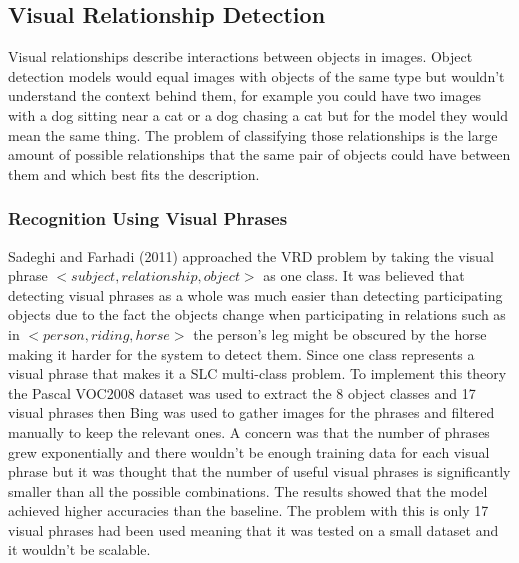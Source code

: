 \documentclass{csfyp}
\begin{document}
\subsection{Visual Relationship Detection}
Visual relationships describe interactions between objects in images. Object detection models would equal images with objects of the same type but wouldn't understand the context behind them, for example you could have two images with a dog sitting near a cat or a dog chasing a cat but for the model they would mean the same thing. The problem of classifying those relationships is the large amount of possible relationships that the same pair of objects could have between them and which best fits the description. 


\subsubsection{Recognition Using Visual Phrases}
Sadeghi and Farhadi (2011) approached the VRD problem by taking the visual phrase $<subject, relationship , object>$ as one class. It was believed that detecting visual phrases as a whole was much easier than detecting participating objects due to the fact the objects change when participating in relations such as in $<person,riding,horse>$ the person’s leg might be obscured by the horse making it harder for the system to detect them. Since one class represents a visual phrase that makes it a SLC multi-class problem. To implement this theory the Pascal VOC2008 dataset was used to extract the 8 object classes and 17 visual phrases then Bing was used to gather images for the phrases and filtered manually to keep the relevant ones.  A concern was that the number of phrases grew exponentially and there wouldn’t be enough training data for each visual phrase but it was thought that the number of useful visual phrases is significantly smaller than all the possible combinations. The results showed that the model achieved higher accuracies than the baseline. The problem with this is only 17 visual phrases had been used meaning that it was tested on a small dataset and it wouldn’t be scalable.
\end{document}
